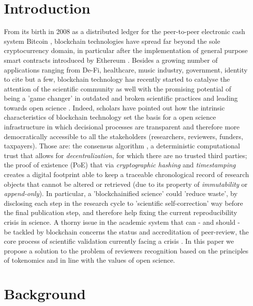 \documentclass[runningheads]{llncs}
\begin{document}
\section{Introduction}
From its birth in 2008 as a distributed ledger for the peer-to-peer electronic cash system Bitcoin \cite{BitcoinSatoshi}, blockchain technologies have spread far beyond the sole cryptocurrency domain, in particular after the implementation of general purpose smart contracts introduced by Ethereum \cite{Ethereum-Wood}.
Besides a growing number of applications ranging from De-Fi, healthcare, music industry, government, identity to cite but a few, blockchain technology has recently started to catalyse the attention of the scientific community as well \cite{Bitcoin-Nature-focus,vanRossum2017-DigSci} with the promising potential of being a 'game changer' in outdated and broken scientific practices and leading towards open science \cite{AES}. Indeed, scholars have pointed out how the intrinsic characteristics of blockchain technology set the basis for a open science infrastructure \cite{ReviewBlockchain2019} in which decisional processes are transparent and therefore more democratically accessible to all the stakeholders (researchers, reviewers, funders, taxpayers). Those are: the consensus algorithm \cite{ConsAlg}, a deterministic computational trust that allows for \emph{decentralization}, for which there are no trusted third parties; the proof of existence (PoE) that via \emph{cryptographic hashing} and \emph{timestamping} creates a digital footprint able to keep a traceable chronological record of research objects that cannot be altered or retrieved (due to its property of \emph{immutability} or \emph{append-only})\cite{ReviewBlockchain2019}. In particular, a 'blockchainified science'\cite{BlockchainforScience} could 'reduce waste'\cite{ReducingWaste-Lancet}, by disclosing each step in the research cycle to 'scientific self-correction' way before the final publication step, and therefore help fixing the current reproducibility crisis in science.
\newline A thorny issue in the academic system that can - and should - be tackled by blockchain concerns the status and accreditation of peer-review, the core process of scientific validation currently facing a crisis \cite{Gropp-PeerRevStress}.
In this paper we propose a solution to the problem of reviewers recognition based on the principles of tokenomics \cite{TokenEcon} and in line with the values of open science.

\section{Background}
\end{document}
